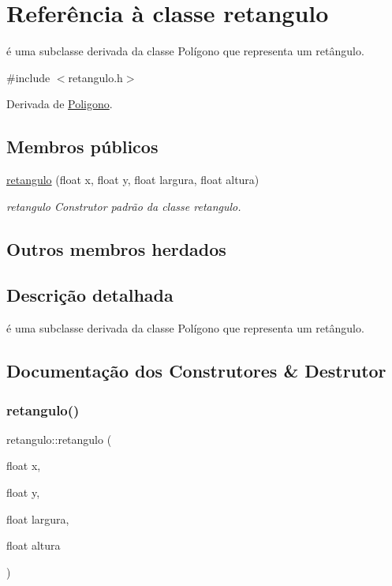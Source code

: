 \hypertarget{classretangulo}{}\section{Referência à classe retangulo}
\label{classretangulo}


é uma subclasse derivada da classe Polígono que representa um retângulo.  




{\ttfamily \#include $<$retangulo.\+h$>$}



Derivada de \mbox{\hyperlink{class_poligono}{Poligono}}.

\subsection*{Membros públicos}
\begin{DoxyCompactItemize}
\item 
\mbox{\hyperlink{classretangulo_aa1ee6d87623cac789fd2fb446f88dcf5}{retangulo}} (float x, float y, float largura, float altura)
\begin{DoxyCompactList}\small\item\em retangulo Construtor padrão da classe retangulo. \end{DoxyCompactList}\end{DoxyCompactItemize}
\subsection*{Outros membros herdados}


\subsection{Descrição detalhada}
é uma subclasse derivada da classe Polígono que representa um retângulo. 

\subsection{Documentação dos Construtores \& Destrutor}
\mbox{\label{classretangulo_aa1ee6d87623cac789fd2fb446f88dcf5}} 
\subsubsection{\texorpdfstring{retangulo()}{retangulo()}}
{\footnotesize\ttfamily retangulo\+::retangulo (\begin{DoxyParamCaption}\item[{float}]{x,  }\item[{float}]{y,  }\item[{float}]{largura,  }\item[{float}]{altura }\end{DoxyParamCaption})}




